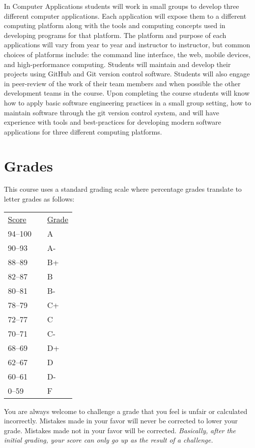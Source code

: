 \documentclass[10pt]{article}
\begin{document}
In Computer Applications students will work in small groups to develop three different computer applications.  Each application will expose them to a different computing platform along with the tools and computing concepts used in developing programs for that platform. The platform and purpose of each applications will vary from year to year and instructor to instructor, but common choices of platforms include: the command line interface, the web, mobile devices, and high-performance computing. Students will maintain and develop their projects using GitHub and Git version control software. Students will also engage in peer-review of the work of their team members and when possible the other development teams in the course. Upon completing the course students will know how to apply basic software engineering practices in a small group setting, how to maintain software through the git version control system, and will have experience with tools and best-practices for developing modern software applications for three different computing platforms.

\section{Grades}

This course uses a standard grading scale where percentage grades translate to letter grades as follows:

\begin{center}
\begin{small}
\begin{tabular}{lcl}
\underline{Score} & & \underline{Grade} \\
94--100 & & A \\
90--93 & & A- \\
88--89 & & B+ \\
82--87 & & B \\
80--81 & & B- \\
78--79 & & C+ \\
72--77 & & C \\
70--71 & & C- \\
68--69 & & D+ \\
62--67 & & D \\
60--61 & & D- \\
0--59 & & F
\end{tabular}
\end{small}
\end{center}


You are always welcome to challenge a grade that you feel is unfair or calculated incorrectly.  Mistakes made in your favor will never be corrected to lower your grade.  Mistakes made not in your favor will be corrected.  \textit{Basically, after the initial grading, your score can only go up as the result of a challenge.}
\end{document}
